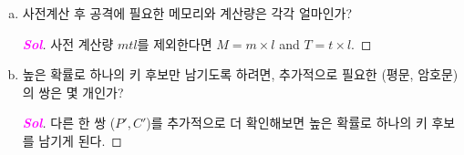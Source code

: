 \begin{enumerate}[\bf 1.]
\begin{enumerate}[(a)]
\begin{proof}[\textcolor{magenta}{\bf Sol}]
\end{proof}
	\item 사전계산 후 공격에 필요한 메모리와 계산량은 각각 얼마인가?
	\begin{proof}[\textcolor{magenta}{\bf Sol}]
	사전 계산량 $mtl$를 제외한다면 $M=m\times l$ and $T=t\times l$.
	\end{proof}
	\item 높은 확률로 하나의 키 후보만 남기도록 하려면, 추가적으로 필요한 (평문,
	암호문)의 쌍은 몇 개인가?
	\begin{proof}[\textcolor{magenta}{\bf Sol}]
		다른 한 쌍 ($P',C'$)를 추가적으로 더 확인해보면 높은 확률로 하나의 키 후보를 남기게 된다.
	\end{proof}
\end{enumerate} %
\end{enumerate}

%
